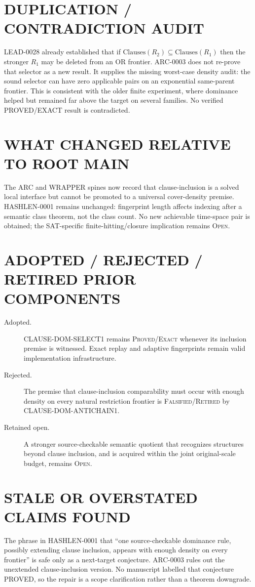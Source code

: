 \documentclass[11pt]{article}
\begin{document}
\section{DUPLICATION / CONTRADICTION AUDIT}
LEAD-0028 already established that if
$\mathrm{Clauses}(R_2)\subseteq\mathrm{Clauses}(R_1)$ then the stronger
$R_1$ may be deleted from an OR frontier.  ARC-0003 does not re-prove that
selector as a new result.  It supplies the missing worst-case density audit:
the sound selector can have zero applicable pairs on an exponential
same-parent frontier.  This is consistent with the older finite experiment,
where dominance helped but remained far above the target on several families.
No verified PROVED/EXACT result is contradicted.

\section{WHAT CHANGED RELATIVE TO ROOT MAIN}
The ARC and WRAPPER spines now record that clause-inclusion is a solved local
interface but cannot be promoted to a universal cover-density premise.
HASHLEN-0001 remains unchanged: fingerprint length affects indexing after a
semantic class theorem, not the class count.  No new achievable time-space
pair is obtained; the SAT-specific finite-hitting/closure implication remains
\textsc{Open}.

\section{ADOPTED / REJECTED / RETIRED PRIOR COMPONENTS}
\begin{description}
\item[Adopted.] CLAUSE-DOM-SELECT1 remains \textsc{Proved/Exact} whenever
its inclusion premise is witnessed.  Exact replay and adaptive fingerprints
remain valid implementation infrastructure.
\item[Rejected.] The premise that clause-inclusion comparability must occur
with enough density on every natural restriction frontier is
\textsc{Falsified/Retired} by CLAUSE-DOM-ANTICHAIN1.
\item[Retained open.] A stronger source-checkable semantic quotient that
recognizes structures beyond clause inclusion, and is acquired within the
joint original-scale budget, remains \textsc{Open}.
\end{description}

\section{STALE OR OVERSTATED CLAIMS FOUND}
The phrase in HASHLEN-0001 that ``one source-checkable dominance rule,
possibly extending clause inclusion, appears with enough density on every
frontier'' is safe only as a next-target conjecture.  ARC-0003 rules out the
unextended clause-inclusion version.  No manuscript labelled that conjecture
PROVED, so the repair is a scope clarification rather than a theorem
downgrade.
\end{document}
